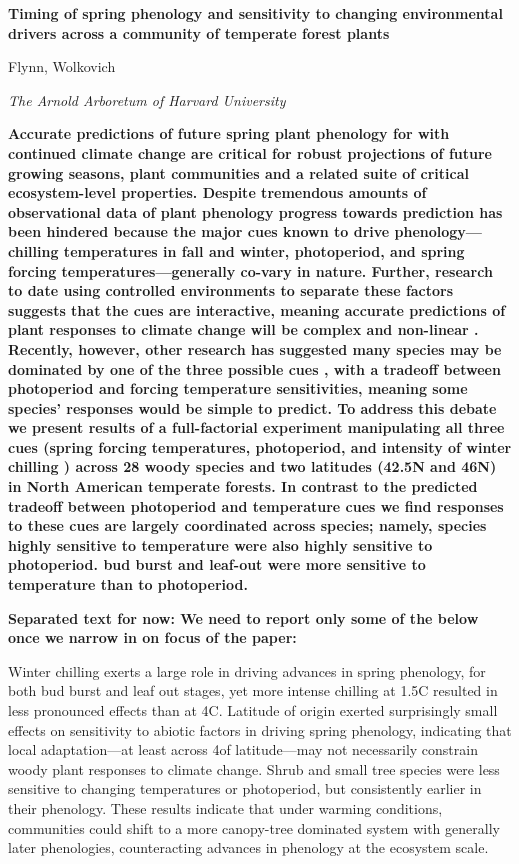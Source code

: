 \documentclass[11pt]{article}
\begin{document}
\linenumbers
 

\flushleft
\textbf{\large{Timing of spring phenology and sensitivity to changing environmental drivers across a community of temperate forest plants}}

Flynn, Wolkovich

\textit{The Arnold Arboretum of Harvard University}


\textbf{Accurate predictions of future spring plant phenology for with continued climate change are critical for robust projections of future growing seasons, plant communities and a related suite of critical ecosystem-level properties. Despite tremendous amounts of observational data of plant phenology progress towards prediction has been hindered because the major cues known to drive phenology---chilling temperatures in fall and winter, photoperiod, and spring forcing temperatures---generally co-vary in nature. Further, research to date using controlled environments to separate these factors suggests that the cues are interactive, meaning accurate predictions of plant responses to climate change will be complex and non-linear \cite{Chuine:1999aa}. Recently, however, other research has suggested many species may be dominated by one of the three possible cues \cite{Korner:2010}, with a tradeoff between photoperiod and forcing temperature sensitivities, meaning some species' responses would be simple to predict. To address this debate we present results of a full-factorial experiment manipulating all three cues (spring forcing temperatures, photoperiod, and intensity of winter chilling ) across 28 woody species and two latitudes (42.5\degree N and 46\degree N) in North American temperate forests. In contrast to the predicted tradeoff between photoperiod and temperature cues we find responses to these cues are  largely coordinated across species; namely, species highly sensitive to temperature were also highly sensitive to photoperiod. bud burst and leaf-out were more sensitive to temperature than to photoperiod.}

{\bf Separated text for now: We need to report only some of the below once we narrow in on focus of the paper:}

Winter chilling exerts a large role in driving advances in spring phenology, for both bud burst and leaf out stages, yet more intense chilling at 1.5\degree C resulted in less pronounced effects than at 4\degree C. Latitude of origin exerted surprisingly small effects on sensitivity to abiotic factors in driving spring phenology, indicating that local adaptation---at least across 4\degree of latitude---may not necessarily constrain woody plant responses to climate change. Shrub and small tree species were less sensitive to changing temperatures or photoperiod, but consistently earlier in their phenology. These results indicate that under warming conditions, communities could shift to a more canopy-tree dominated system with generally later phenologies, counteracting advances in phenology at the ecosystem scale.
\end{document}
